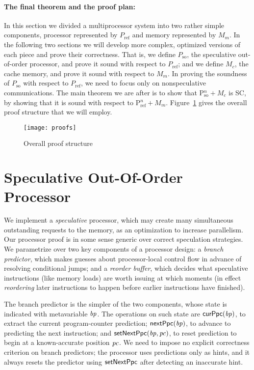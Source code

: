 \paragraph{The final theorem and the proof plan:} 
In this section we divided a multiprocessor system into two rather simple
components, processor represented by $P_\text{ref}$ and memory represented by
$M_m$. In the following two sections we will develop more complex, optimized
versions of each piece and prove their correctness.  That is, we define $P_\text{so}$, the
speculative out-of-order processor, and prove it sound with respect to $P_\text{ref}$;
and we define $M_c$, the cache memory, and prove it sound with respect to $M_m$. In proving the
soundness of $P_\text{so}$ with respect to $P_\text{ref}$, we need to focus
only on nonspeculative communications. The main theorem we are after is to
show that P$^n_\text{so}+ M_c$ is SC, by showing that it is sound with respect
to P$^n_\text{ref}+ M_m$. Figure~\ref{proofs} gives the overall proof structure
that we will employ.


\begin{figure}
\texttt{[image: proofs]}
\caption{Overall proof structure}
\label{proofs}
\end{figure}


\section{Speculative Out-Of-Order Processor}\label{sec:ooo}

We implement a \emph{speculative} processor, which may create many
simultaneous outstanding requests to the memory, as an optimization to
increase parallelism.  Our processor proof is in some sense generic
over correct speculation strategies.  We parametrize over two key
components of a processor design: a \emph{branch predictor}, which
makes guesses about processor-local control flow in advance of
resolving conditional jumps; and a
\emph{reorder buffer}, which decides what speculative instructions (like memory loads)
are worth issuing at which moments (in effect \emph{reordering} later
instructions to happen before earlier instructions have finished).

The branch predictor is the simpler of the two components, whose state
is indicated with metavariable $\mathit{bp}$.
The operations on such state are $\mathsf{curPpc}(\mathit{bp})$, to extract the
current program-counter prediction; $\mathsf{nextPpc}(\mathit{bp})$, to advance to predicting
the next instruction; and $\mathsf{setNextPpc}(\mathit{bp}, \mathit{pc})$,
to reset prediction to begin at a known-accurate position $\mathit{pc}$. We need to impose no explicit correctness criterion on
branch predictors; the processor uses predictions only as hints, and
it always resets the predictor using $\mathsf{setNextPpc}$ after detecting an
inaccurate hint.

